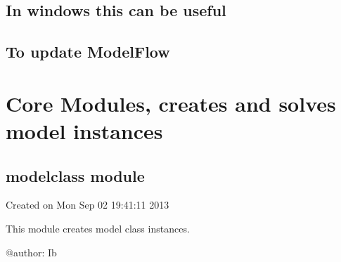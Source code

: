 \documentclass[letterpaper,10pt,english]{sphinxmanual}
\begin{document}
\subsection{In windows this can be useful}
\label{\detokenize{Installation:in-windows-this-can-be-useful}}
\begin{sphinxVerbatim}[commandchars=\\\{\}]
  
\end{sphinxVerbatim}


\subsection{To update ModelFlow}
\label{\detokenize{Installation:to-update-modelflow}}
\begin{sphinxVerbatim}[commandchars=\\\{\}]
        
\end{sphinxVerbatim}

\sphinxstepscope


\section{Core Modules, creates and solves model instances}
\label{\detokenize{core/Core:core-modules-creates-and-solves-model-instances}}\label{\detokenize{core/Core::doc}}
\sphinxstepscope


\subsection{modelclass module}
\label{\detokenize{core/modelclass:module-modelclass}}\label{\detokenize{core/modelclass:modelclass-module}}\label{\detokenize{core/modelclass::doc}}
\sphinxAtStartPar
Created on Mon Sep 02 19:41:11 2013

\sphinxAtStartPar
This module creates model class instances.

\sphinxAtStartPar
@author: Ib
\end{document}
